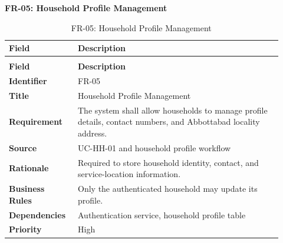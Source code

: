 \documentclass[12pt,a4paper]{article}
\begin{document}
\noindent\textbf{FR-05: Household Profile Management}\par
\vspace{4pt}
\begingroup\small\setlength{\tabcolsep}{4pt}\renewcommand{\arraystretch}{1.15}
\begin{longtable}{|>{\raggedright\arraybackslash}p{0.22\linewidth}|>{\raggedright\arraybackslash}p{0.70\linewidth}|}
\caption{FR-05: Household Profile Management}\label{tab:fr-05}\\
\hline
\textbf{Field} & \textbf{Description} \\ \hline
\endfirsthead
\multicolumn{2}{c}{Table \thetable\ Household Profile Management (continued)}\\
\hline
\textbf{Field} & \textbf{Description} \\ \hline
\endhead
\textbf{Identifier} & FR-05 \\ \hline
\textbf{Title} & Household Profile Management \\ \hline
\textbf{Requirement} & The system shall allow households to manage profile details, contact numbers, and Abbottabad locality address. \\ \hline
\textbf{Source} & UC-HH-01 and household profile workflow \\ \hline
\textbf{Rationale} & Required to store household identity, contact, and service-location information. \\ \hline
\textbf{Business Rules} & Only the authenticated household may update its profile. \\ \hline
\textbf{Dependencies} & Authentication service, household profile table \\ \hline
\textbf{Priority} & High \\ \hline
\end{longtable}
\endgroup
\end{document}
